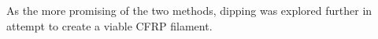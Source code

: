 As the more promising of the two methods, dipping was explored further in attempt to create a viable CFRP filament.\\





%
%

